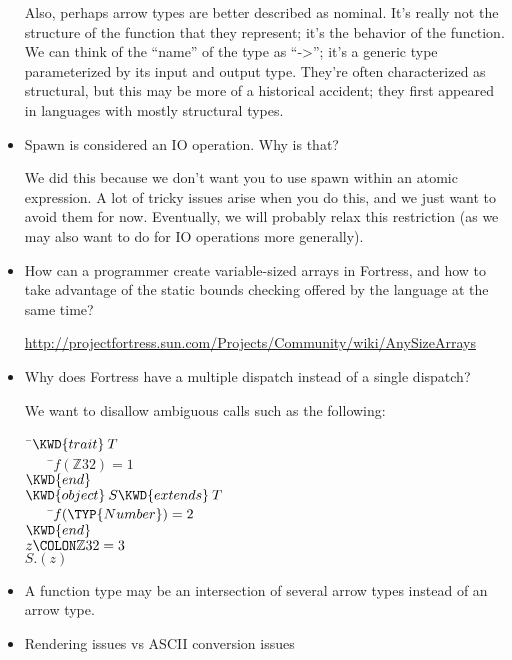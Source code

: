 \begin{itemize}
Also, perhaps arrow types are better described as nominal.  It's really not
the structure of the function that they represent; it's the behavior of the
function.  We can think of the ``name'' of the type as ``->''; it's a generic
type parameterized by its input and output type.  They're often characterized
as structural, but this may be more of a historical accident; they first
appeared in languages with mostly structural types.

\item Spawn is considered an IO operation.  Why is that?

We did this because we don't want you to use spawn within an atomic expression.  A lot of tricky issues arise when you do this, and we just want to avoid them for now.  Eventually, we will probably relax this restriction (as we may also want to do for IO operations more generally).

\item How can a programmer create variable-sized arrays in Fortress, and how to take advantage of the static bounds checking offered by the language at the same time?

\url{http://projectfortress.sun.com/Projects/Community/wiki/AnySizeArrays}

\item Why does Fortress have a multiple dispatch instead of a single dispatch?

We want to disallow ambiguous calls such as the following:
\begin{Fortress}
{\tt~}\pushtabs\=\+\( \KWD{trait}\:T\)\\
{\tt~~~~}\pushtabs\=\+\(     f(\mathbb{Z}32) = 1\)\-\\\poptabs
\( \KWD{end}\)\\
\( \KWD{object}\:S \KWD{extends}\:T\)\\
{\tt~~~~}\pushtabs\=\+\(     f(\TYP{Number}) = 2\)\-\\\poptabs
\( \KWD{end}\)\\
\( z\COLON \mathbb{Z}32 = 3\)\\
\( S.(z)\)\-\\\poptabs
\end{Fortress}


\item A function type may be an intersection of several arrow types
instead of an arrow type.

\item Rendering issues vs ASCII conversion issues


\end{itemize}
